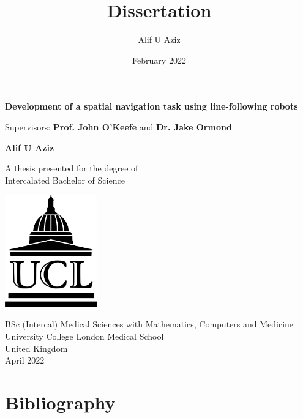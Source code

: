 \documentclass{article}
\title{Dissertation}
\author{Alif U Aziz}
\date{February 2022}
\begin{document}
\begin{titlepage}
   \begin{center}
       \vspace*{1cm}
    \large
       \textbf{Development of a spatial navigation task using line-following robots}

       \vspace{0.5cm}
        Supervisors: \textbf{Prof. John O'Keefe} and \textbf{Dr. Jake Ormond}
            
       \vspace{1.5cm}

       \textbf{Alif U Aziz}

       \vfill
            
       A thesis presented for the degree of\\
       Intercalated Bachelor of Science
            
       \vspace{0.8cm}
     
       \includegraphics[width=0.3\textwidth]{images/ucl_logo.png}
    
        \vspace{1 cm}
       BSc (Intercal) Medical Sciences with Mathematics, Computers and Medicine \\
       University College London Medical School\\
       United Kingdom\\
       April 2022
            
   \end{center}
\end{titlepage}

\tableofcontents
\pagebreak


\pagebreak


\pagebreak


\pagebreak


\pagebreak


\pagebreak

\section*{Bibliography}
 


\pagebreak

\end{document}
